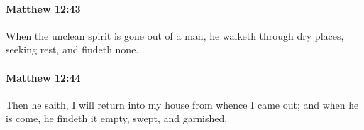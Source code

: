 		\paragraph{Matthew 12:43} %
			\label{MATTHEW-12-43}

			When the unclean spirit is gone out of a man, he walketh through dry places, seeking rest, and findeth none.

			\begin{framed}
			\scriptsize
				\begin{compactdesc}
					\item[SBLG] 
				\end{compactdesc}
			\end{framed}

		\paragraph{Matthew 12:44} %
			\label{MATTHEW-12-44}

			Then he saith, I will return into my house from whence I came out; and when he is come, he findeth it empty, swept, and garnished.


